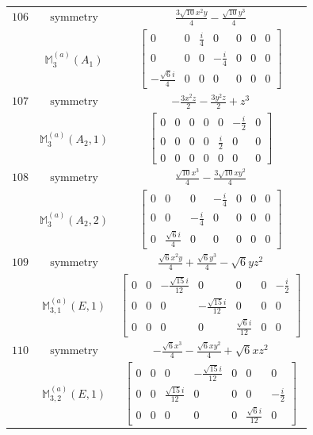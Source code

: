 \documentclass[fleqn,8pt,landscape]{jsarticle}
\begin{document}
\begin{longtable}{ccc}
$ 106 $ & $ \text{symmetry} $ & $ \frac{3 \sqrt{10} x^{2} y}{4} - \frac{\sqrt{10} y^{3}}{4} $ \\
$  $ & $ \mathbb{M}_{3}^{(a)}(A_{1}) $ & $ \begin{bmatrix} 0 & 0 & \frac{i}{4} & 0 & 0 & 0 & 0 \\ 0 & 0 & 0 & - \frac{i}{4} & 0 & 0 & 0 \\ - \frac{\sqrt{6} i}{4} & 0 & 0 & 0 & 0 & 0 & 0 \end{bmatrix} $ \\ \hline
$ 107 $ & $ \text{symmetry} $ & $ - \frac{3 x^{2} z}{2} - \frac{3 y^{2} z}{2} + z^{3} $ \\
$  $ & $ \mathbb{M}_{3}^{(a)}(A_{2},1) $ & $ \begin{bmatrix} 0 & 0 & 0 & 0 & 0 & - \frac{i}{2} & 0 \\ 0 & 0 & 0 & 0 & \frac{i}{2} & 0 & 0 \\ 0 & 0 & 0 & 0 & 0 & 0 & 0 \end{bmatrix} $ \\ \hline
$ 108 $ & $ \text{symmetry} $ & $ \frac{\sqrt{10} x^{3}}{4} - \frac{3 \sqrt{10} x y^{2}}{4} $ \\
$  $ & $ \mathbb{M}_{3}^{(a)}(A_{2},2) $ & $ \begin{bmatrix} 0 & 0 & 0 & - \frac{i}{4} & 0 & 0 & 0 \\ 0 & 0 & - \frac{i}{4} & 0 & 0 & 0 & 0 \\ 0 & \frac{\sqrt{6} i}{4} & 0 & 0 & 0 & 0 & 0 \end{bmatrix} $ \\ \hline
$ 109 $ & $ \text{symmetry} $ & $ \frac{\sqrt{6} x^{2} y}{4} + \frac{\sqrt{6} y^{3}}{4} - \sqrt{6} y z^{2} $ \\
$  $ & $ \mathbb{M}_{3,1}^{(a)}(E,1) $ & $ \begin{bmatrix} 0 & 0 & - \frac{\sqrt{15} i}{12} & 0 & 0 & 0 & - \frac{i}{2} \\ 0 & 0 & 0 & - \frac{\sqrt{15} i}{12} & 0 & 0 & 0 \\ 0 & 0 & 0 & 0 & \frac{\sqrt{6} i}{12} & 0 & 0 \end{bmatrix} $ \\ \hline
$ 110 $ & $ \text{symmetry} $ & $ - \frac{\sqrt{6} x^{3}}{4} - \frac{\sqrt{6} x y^{2}}{4} + \sqrt{6} x z^{2} $ \\
$  $ & $ \mathbb{M}_{3,2}^{(a)}(E,1) $ & $ \begin{bmatrix} 0 & 0 & 0 & - \frac{\sqrt{15} i}{12} & 0 & 0 & 0 \\ 0 & 0 & \frac{\sqrt{15} i}{12} & 0 & 0 & 0 & - \frac{i}{2} \\ 0 & 0 & 0 & 0 & 0 & \frac{\sqrt{6} i}{12} & 0 \end{bmatrix} $ \\ \hline

\end{longtable}
\end{document}
